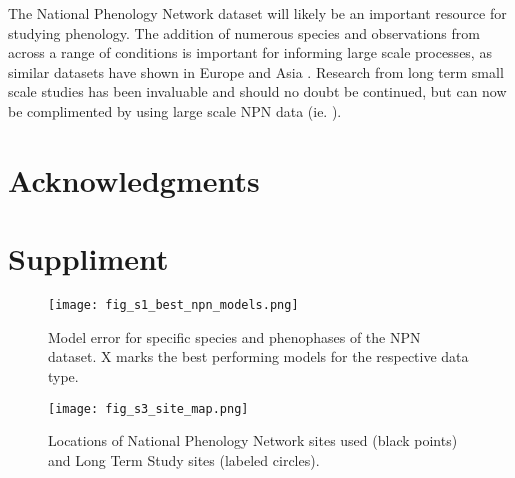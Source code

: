 \documentclass[fleqn,10pt,lineno]{wlpeerj} %
\begin{document}
The National Phenology Network dataset will likely be an important resource for studying phenology. The addition of numerous species and observations from across a range of conditions is important for informing large scale processes, as similar datasets have shown in Europe \citep{olsson2014, basler2016} and Asia \citep{xu2013, zhang2017}. Research from long term small scale studies has been invaluable and should no doubt be continued, but can now be complimented by using large scale NPN data (ie. \citep{jeong2013, melaas2016}).

\section*{Acknowledgments}



\setcounter{figure}{0}    
\section*{Suppliment}
\begin{figure}
	\centering
		\texttt{[image: fig\_s1\_best\_npn\_models.png]}
	\caption{Model error for specific species and phenophases of the NPN dataset. X marks the best performing models for the respective data type.}
\end{figure}

\begin{figure}
	\centering
		\texttt{[image: fig\_s3\_site\_map.png]}
	\caption{Locations of National Phenology Network sites used (black points) and Long Term Study sites (labeled circles).}
\end{figure}
\end{document}
